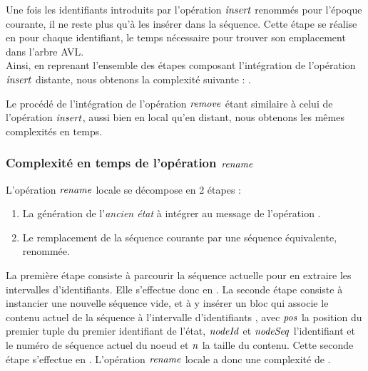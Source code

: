 Une fois les identifiants introduits par l'opération $\mathit{insert}$ renommés pour l'époque courante, il ne reste plus qu'à les insérer dans la séquence.
Cette étape se réalise en  pour chaque identifiant, le temps nécessaire pour trouver son emplacement dans l'arbre AVL.\\

Ainsi, en reprenant l'ensemble des étapes composant l'intégration de l'opération $\mathit{insert}$ distante, nous obtenons la complexité suivante : .

Le procédé de l'intégration de l'opération $\mathit{remove}$ étant similaire à celui de l'opération $\mathit{insert}$, aussi bien en local qu'en distant, nous obtenons les mêmes complexités en temps.

\subsubsection{Complexité en temps de l'opération $\mathit{rename}$}
\label{sec:validation-time-complexity-rename}

L'opération $\mathit{rename}$ locale se décompose en 2 étapes :
\begin{enumerate}
  \item La génération de l'\emph{ancien état} à intégrer au message de l'opération .
  \item Le remplacement de la séquence courante par une séquence équivalente, renommée.
\end{enumerate}
La première étape consiste à parcourir la séquence actuelle pour en extraire les intervalles d'identifiants.
Elle s'effectue donc en .
La seconde étape consiste à instancier une nouvelle séquence vide, et à y insérer un bloc qui associe le contenu actuel de la séquence à l'intervalle d'identifiants , avec $\mathit{pos}$ la position du premier tuple du premier identifiant de l'état, $\mathit{nodeId}$ et $\mathit{nodeSeq}$ l'identifiant et le numéro de séquence actuel du noeud et $\mathit{n}$ la taille du contenu.
Cette seconde étape s'effectue en .
L'opération $\mathit{rename}$ locale a donc une complexité de .\\


